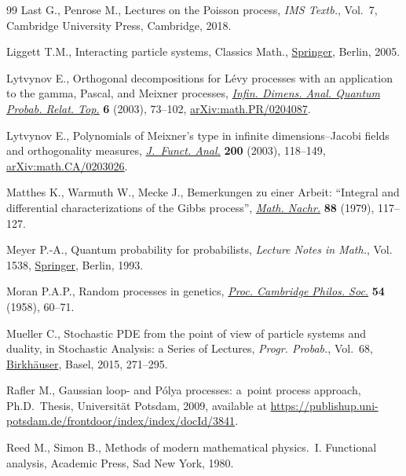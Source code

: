 \documentclass[10pt,a4paper]{amsart}
\numberwithin{equation}{section}
\newcommand{\1}{\mathbbm{1}}
\begin{document}
\begin{thebibliography}{99}
Last G., Penrose M., Lectures on the {P}oisson process, \textit{IMS Textb.},
 Vol.~7, Cambridge University Press, Cambridge, 2018.

Liggett T.M., Interacting particle systems, Classics Math., \href{https://doi.org/10.1007/b138374}{Springer}, Berlin,
 2005.

Lytvynov E., Orthogonal decompositions for {L}\'evy processes with an
 application to the gamma, {P}ascal, and {M}eixner processes, \href{https://doi.org/10.1142/S0219025703001031}{\textit{Infin.
 Dimens. Anal. Quantum Probab. Relat. Top.}} \textbf{6} (2003), 73--102,
 \href{https://arxiv.org/abs/math.PR/0204087}{arXiv:math.PR/0204087}.

Lytvynov E., Polynomials of {M}eixner's type in infinite dimensions--{J}acobi
 fields and orthogonality measures, \href{https://doi.org/10.1016/S0022-1236(02)00081-2}{\textit{J.~Funct. Anal.}} \textbf{200}
 (2003), 118--149, \href{https://arxiv.org/abs/math.CA/0203026}{arXiv:math.CA/0203026}.

Matthes K., Warmuth W., Mecke J., Bemerkungen zu einer {A}rbeit: ``{I}ntegral
 and differential characterizations of the {G}ibbs process'', \href{https://doi.org/10.1002/mana.19790880110}{\textit{Math.
 Nachr.}} \textbf{88} (1979), 117--127.

Meyer P.-A., Quantum probability for probabilists, \textit{Lecture Notes in
 Math.}, Vol. 1538, \href{https://doi.org/10.1007/978-3-662-21558-6}{Springer}, Berlin, 1993.

Moran P.A.P., Random processes in genetics, \href{https://doi.org/10.1017/s0305004100033193}{\textit{Proc. Cambridge Philos.
 Soc.}} \textbf{54} (1958), 60--71.

Mueller C., Stochastic {PDE} from the point of view of particle systems and
 duality, in Stochastic Analysis: a Series of Lectures, \textit{Progr.
 Probab.}, Vol.~68, \href{https://doi.org/10.1007/978-3-0348-0909-2_10}{Birkh\"auser}, Basel, 2015, 271--295.

Rafler M., Gaussian loop- and {P}\'olya processes: a~point process approach,
 Ph.D.~Thesis, {U}niversit\"at {P}otsdam, 2009, available at
 \url{https://publishup.uni-potsdam.de/frontdoor/index/index/docId/3841}.

Reed M., Simon B., Methods of modern mathematical physics.~{I}. Functional
 analysis, Academic Press, Sad New York, 1980.


\end{thebibliography}
\end{document}
